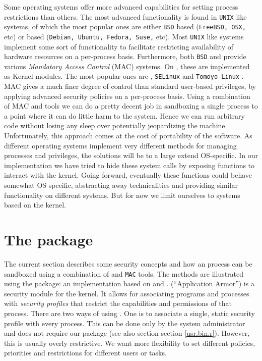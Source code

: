 Some operating systems offer more advanced capabilities for setting process
restrictions than others. The most advanced functionality is found in
\texttt{UNIX} like systems, of which the most popular ones are either
\texttt{BSD} based (\texttt{FreeBSD, OSX,} etc) or \Linux based (\texttt{Debian,
Ubuntu, Fedora, Suse,} etc). Most \texttt{UNIX} like systems implement some sort
of \ULIMIT functionality to facilitate restricting availability of hardware
resources on a per-process basis. Furthermore, both \texttt{BSD} and \Linux
provide various \emph{Mandatory Access Control} (MAC) systems. On \Linux, these
are implemented as Kernel modules. The most popular ones are \AppArmor
\citep{apparmor}, \texttt{SELinux} \citep{selinux} and \texttt{Tomoyo Linux}
\citep{tomoyo}. MAC gives a much finer degree of control than standard
user-based privileges, by applying advanced security policies on a per-process
basis. Using a combination of MAC and \ULIMIT tools we can do a pretty decent
job in sandboxing a single \R process to a point where it can do little harm to
the system. Hence we can run arbitrary \R code without losing any sleep over
potentially jeopardizing the machine. Unfortunately, this approach comes at the
cost of portability of the software. As different operating systems implement
very different methods for managing processes and privileges, the solutions
will be to a large extend OS-specific. In our implementation we have tried to
hide these system calls by exposing \R functions to interact with the kernel.
Going forward, eventually these functions could behave somewhat OS specific,
abstracting away technicalities and providing similar functionality on
different systems. But for now we limit ourselves to systems based on the
\Linux kernel.

\section{The \RAppArmor package}
\label{rapparmor}

The current section describes some security concepts and how an \R process can
be sandboxed using a combination of \ULIMIT and \texttt{MAC} tools. The methods
are illustrated using the \RAppArmor package: an implementation based on \Linux
and \AppArmor. \AppArmor (``Application Armor'') is a security module for the
\Linux kernel. It allows for associating programs and processes with
\emph{security profiles} that restrict the capabilities and permissions of that
process. There are two ways of using \AppArmor. One is to associate a single,
static security profile with every \R process. This can be done only by the
system administrator and does not require our \R package (see also section
section \ref{usr.bin.r}). However, this is usually overly restrictive. We want
more flexibility to set different policies, priorities and restrictions for
different users or tasks.

